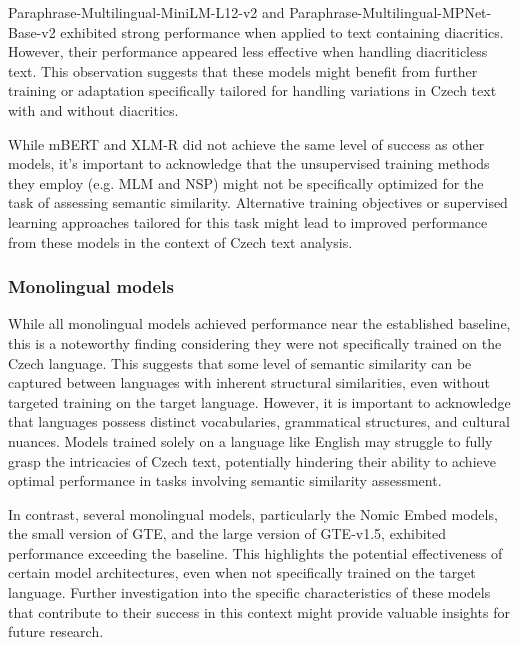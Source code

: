 Paraphrase-Multilingual-MiniLM-L12-v2 and Paraphrase-Multilingual-MPNet-Base-v2 exhibited strong performance when applied to text containing diacritics.
However, their performance appeared less effective when handling diacriticless text.
This observation suggests that these models might benefit from further training or adaptation specifically tailored for handling variations in Czech text with and without diacritics.

While mBERT and XLM-R did not achieve the same level of success as other models, it's important to acknowledge that the unsupervised training methods they employ (e.g. \ac{MLM} and \ac{NSP}) might not be specifically optimized for the task of assessing semantic similarity.
Alternative training objectives or supervised learning approaches tailored for this task might lead to improved performance from these models in the context of Czech text analysis.

\subsubsection{Monolingual models}

While all monolingual models achieved performance near the established baseline, this is a noteworthy finding considering they were not specifically trained on the Czech language.
This suggests that some level of semantic similarity can be captured between languages with inherent structural similarities, even without targeted training on the target language.
However, it is important to acknowledge that languages possess distinct vocabularies, grammatical structures, and cultural nuances.
Models trained solely on a language like English may struggle to fully grasp the intricacies of Czech text, potentially hindering their ability to achieve optimal performance in tasks involving semantic similarity assessment.

In contrast, several monolingual models, particularly the Nomic Embed models, the small version of GTE, and the large version of GTE-v1.5, exhibited performance exceeding the baseline.
This highlights the potential effectiveness of certain model architectures, even when not specifically trained on the target language.
Further investigation into the specific characteristics of these models that contribute to their success in this context might provide valuable insights for future research.

